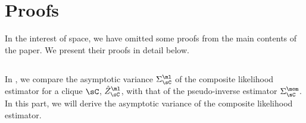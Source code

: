 \section{Proofs}
\label{app:proofs}

In the interest of space, we have omitted some proofs from
the main contents of the paper. 
We present their proofs in detail below.

\subsection{}
\label{app:pw-variance-proof}

In , we compare the asymptotic variance $\Sigma^\ml_\sC$ of the
composite likelihood estimator for a clique $\sC$, $\hat Z^\ml_\sC$, with
that of the pseudo-inverse estimator $\Sigma^\mom_\sC$. 
In this part, we will derive the asymptotic variance of the composite
  likelihood estimator.

